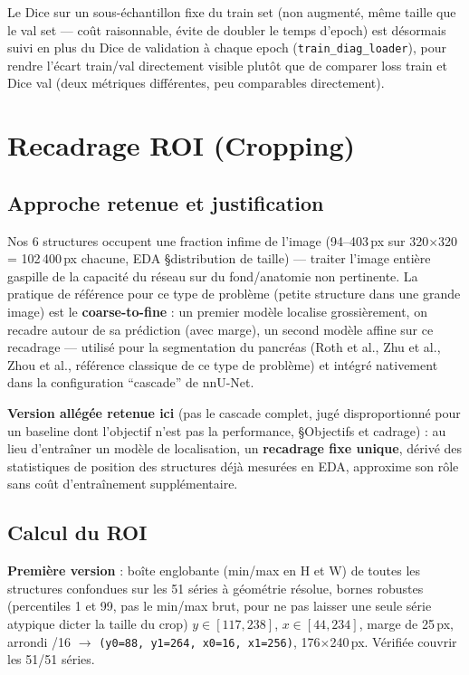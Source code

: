 Le Dice sur un sous-échantillon fixe du train set (non augmenté, même taille que le
val set --- coût raisonnable, évite de doubler le temps d'epoch) est désormais suivi
en plus du Dice de validation à chaque epoch (\texttt{train\_diag\_loader}), pour
rendre l'écart train/val directement visible plutôt que de comparer loss train et
Dice val (deux métriques différentes, peu comparables directement).

\section{Recadrage ROI (Cropping)}
\label{sec:phase1-crop}

\subsection{Approche retenue et justification}

Nos 6 structures occupent une fraction infime de l'image (94--403\,px sur
320$\times$320 = 102\,400\,px chacune, EDA \S distribution de taille) --- traiter
l'image entière gaspille de la capacité du réseau sur du fond/anatomie non
pertinente. La pratique de référence pour ce type de problème (petite structure dans
une grande image) est le \textbf{coarse-to-fine} : un premier modèle localise
grossièrement, on recadre autour de sa prédiction (avec marge), un second modèle
affine sur ce recadrage --- utilisé pour la segmentation du pancréas (Roth et al.,
Zhu et al., Zhou et al., référence classique de ce type de problème) et intégré
nativement dans la configuration ``cascade'' de nnU-Net.

\textbf{Version allégée retenue ici} (pas le cascade complet, jugé disproportionné
pour un baseline dont l'objectif n'est pas la performance, \S Objectifs et cadrage) :
au lieu d'entraîner un modèle de localisation, un \textbf{recadrage fixe unique},
dérivé des statistiques de position des structures déjà mesurées en EDA, approxime
son rôle sans coût d'entraînement supplémentaire.

\subsection{Calcul du ROI}

\textbf{Première version} : boîte englobante (min/max en H et W) de toutes les
structures confondues sur les 51 séries à géométrie résolue, bornes robustes
(percentiles 1 et 99, pas le min/max brut, pour ne pas laisser une seule série
atypique dicter la taille du crop) $y\in[117,238]$, $x\in[44,234]$, marge de 25\,px,
arrondi /16 $\to$ \texttt{(y0=88, y1=264, x0=16, x1=256)}, 176$\times$240\,px.
Vérifiée couvrir les 51/51 séries.


